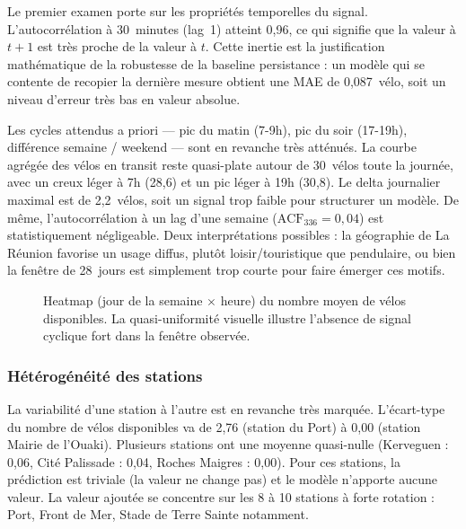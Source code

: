 \documentclass[fleqn, 12pt]{scrartcl}
\begin{document}
Le premier examen porte sur les propriétés temporelles du signal. L'autocorrélation à 30~minutes (lag~1) atteint 0{,}96, ce qui signifie que la valeur à $t+1$ est très proche de la valeur à $t$. Cette inertie est la justification mathématique de la robustesse de la baseline persistance : un modèle qui se contente de recopier la dernière mesure obtient une MAE de 0{,}087~vélo, soit un niveau d'erreur très bas en valeur absolue.

\vspace{0.3cm}

Les cycles attendus a priori --- pic du matin (7-9h), pic du soir (17-19h), différence semaine / weekend --- sont en revanche très atténués. La courbe agrégée des vélos en transit reste quasi-plate autour de 30~vélos toute la journée, avec un creux léger à 7h (28{,}6) et un pic léger à 19h (30{,}8). Le delta journalier maximal est de 2{,}2~vélos, soit un signal trop faible pour structurer un modèle. De même, l'autocorrélation à un lag d'une semaine ($\text{ACF}_{336} = 0{,}04$) est statistiquement négligeable. Deux interprétations possibles : la géographie de La Réunion favorise un usage diffus, plutôt loisir/touristique que pendulaire, ou bien la fenêtre de 28~jours est simplement trop courte pour faire émerger ces motifs.

\begin{figure}[htp]
    \caption{Heatmap (jour de la semaine $\times$ heure) du nombre moyen de vélos disponibles. La quasi-uniformité visuelle illustre l'absence de signal cyclique fort dans la fenêtre observée.}
    \label{fig:heatmap}
\end{figure}

\subsubsection*{Hétérogénéité des stations}

La variabilité d'une station à l'autre est en revanche très marquée. L'écart-type du nombre de vélos disponibles va de 2{,}76 (station du Port) à 0{,}00 (station Mairie de l'Ouaki). Plusieurs stations ont une moyenne quasi-nulle (Kerveguen : 0{,}06, Cité Palissade : 0{,}04, Roches Maigres : 0{,}00). Pour ces stations, la prédiction est triviale (la valeur ne change pas) et le modèle n'apporte aucune valeur. La valeur ajoutée se concentre sur les 8 à 10 stations à forte rotation : Port, Front de Mer, Stade de Terre Sainte notamment.
\end{document}
